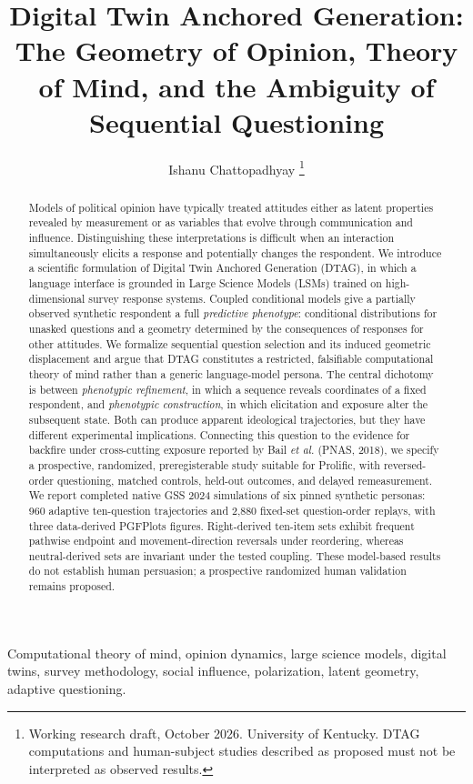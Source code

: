 \documentclass[journal,10pt]{IEEEtran}
\title{Digital Twin Anchored Generation: The Geometry of Opinion, Theory of Mind, and the Ambiguity of Sequential Questioning}
\author{Ishanu Chattopadhyay%
\thanks{Working research draft, October 2026. University of Kentucky. DTAG computations and human-subject studies described as proposed must not be interpreted as observed results.}}
\begin{document}
\maketitle
\begin{abstract}
Models of political opinion have typically treated attitudes either as latent properties revealed by measurement or as variables that evolve through communication and influence. Distinguishing these interpretations is difficult when an interaction simultaneously elicits a response and potentially changes the respondent. We introduce a scientific formulation of Digital Twin Anchored Generation (DTAG), in which a language interface is grounded in Large Science Models (LSMs) trained on high-dimensional survey response systems. Coupled conditional models give a partially observed synthetic respondent a full \emph{predictive phenotype}: conditional distributions for unasked questions and a geometry determined by the consequences of responses for other attitudes. We formalize sequential question selection and its induced geometric displacement and argue that DTAG constitutes a restricted, falsifiable computational theory of mind rather than a generic language-model persona. The central dichotomy is between \emph{phenotypic refinement}, in which a sequence reveals coordinates of a fixed respondent, and \emph{phenotypic construction}, in which elicitation and exposure alter the subsequent state. Both can produce apparent ideological trajectories, but they have different experimental implications. Connecting this question to the evidence for backfire under cross-cutting exposure reported by Bail \emph{et al.} (PNAS, 2018), we specify a prospective, randomized, preregisterable study suitable for Prolific, with reversed-order questioning, matched controls, held-out outcomes, and delayed remeasurement. We report completed native GSS 2024 simulations of six pinned synthetic personas: 960 adaptive ten-question trajectories and 2,880 fixed-set question-order replays, with three data-derived PGFPlots figures. Right-derived ten-item sets exhibit frequent pathwise endpoint and movement-direction reversals under reordering, whereas neutral-derived sets are invariant under the tested coupling. These model-based results do not establish human persuasion; a prospective randomized human validation remains proposed.
\end{abstract}
\begin{IEEEkeywords}
Computational theory of mind, opinion dynamics, large science models, digital twins, survey methodology, social influence, polarization, latent geometry, adaptive questioning.
\end{IEEEkeywords}
\end{document}
